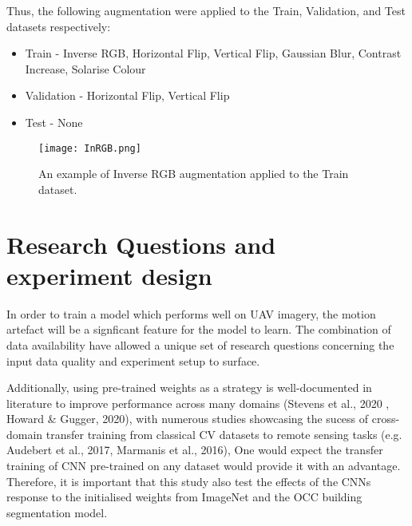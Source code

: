 \documentclass[11pt, a4paper, twoside]{report}
\begin{document}
Thus, the following augmentation were applied to the Train, Validation, and Test datasets respectively:

\begin{itemize}
  \item Train - Inverse RGB, Horizontal Flip, Vertical Flip, Gaussian Blur, Contrast Increase, Solarise Colour
  \item Validation - Horizontal Flip, Vertical Flip
  \item Test - None
\end{itemize}

\begin{figure}[H]
  \centering
  \texttt{[image: InRGB.png]}
  \caption{An example of Inverse RGB augmentation applied to the Train dataset.}
  \label{fig:InRGB}
\end{figure}

\begin{table}[H]
  \centering
  \label{table:data_count)}
  \caption{Resulted image and label pair for each dataset input configuration}
\end{table}

\section{Research Questions and experiment design}\label{RQ}

In order to train a model which performs well on UAV imagery, the motion artefact will be a signficant feature for the model to learn. The combination of data availability have allowed a unique set of research questions concerning the input data quality and experiment setup to surface.\\\par

Additionally, using pre-trained weights as a strategy is well-documented in literature to improve performance across many domains (Stevens et al., 2020 , Howard \& Gugger, 2020), with numerous studies showcasing the sucess of cross-domain transfer training from classical CV datasets to remote sensing tasks (e.g. Audebert et al., 2017, Marmanis et al., 2016), One would expect the transfer training of CNN pre-trained on any dataset would provide it with an advantage. Therefore, it is important that this study also test the effects of the CNNs response to the initialised weights from ImageNet and the OCC building segmentation model.\\\par
\end{document}
